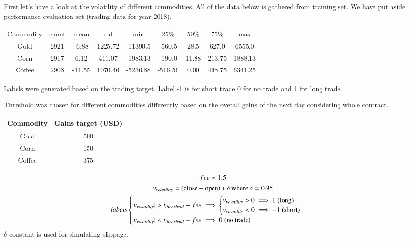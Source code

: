 \documentclass[final,2p]{elsarticle}
\begin{document}
First let's have a look at the volatility of different commodities. All of the data below is gathered from training set. We have put aside performance evaluation set (trading data for year 2018).
\begin{center}
    \begin{tabular}{ccccccccc}
        Commodity & count & mean & std & min & 25\% & 50\% & 75\% & max \\
        Gold & 2921 & -6.88 & 1225.72 & -11390.5 & -560.5 & 28.5 & 627.0 & 6555.0 \\
        Corn & 2917 & 6.12 & 411.07 & -1983.13 & -190.0 & 11.88 & 213.75 & 1888.13 \\
        Coffee & 2908 & -11.55 & 1070.46 & -5236.88 & -516.56 & 0.00 & 498.75 & 6341.25 \\
    \end{tabular}
\end{center}

Labels were generated based on the trading target.
Label -1 is for short trade 0 for no trade and 1 for long trade.

Threshold was chosen for different commodities differently based on the overall gains of the next day considering whole contract.

\begin{center}
\begin{tabular}{cc}
    \centering
    Commodity & Gains target (USD) \\
    \hline
    Gold & 500 \\
    Corn & 150 \\
    Coffee & 375 \\
\end{tabular}
\end{center}

\begin{gather}
    fee = 1.5 \\
    v_{volatility} = (\textup{close} - \textup{open})*\delta \textup{ where } \delta = 0.95 \\
    labels
    \begin{cases}
        | v_{volatility} | > t_{threshold} + fee \implies
        \begin{cases}
            v_{volatility} > 0 \implies 1 \textup{ (long)} \\
            v_{volatility} < 0 \implies -1 \textup{ (short)} \\
        \end{cases}\\
        | v_{volatility} | < t_{threshold} + fee \implies 0 \textup{ (no trade)}
    \end{cases}
\end{gather}
$\delta$ constant is used for simulating slippage.
\end{document}
